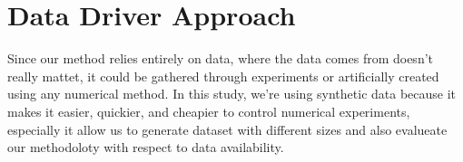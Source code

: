 




\section{Data Driver Approach}

Since our method relies entirely on data, where the data comes from doesn't really mattet, it could be gathered through experiments or artificially created using any numerical method. In this study, we're using synthetic data because it makes it easier, quickier, and cheapier to control numerical experiments, especially it allow us to generate dataset with different sizes and also evalueate our methodoloty with respect to data availability.

